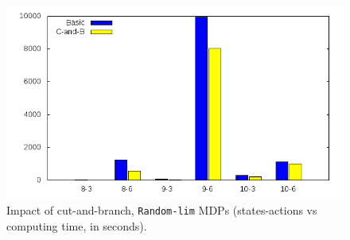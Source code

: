 \begin{figure}[]
	\begin{center}
    \includegraphics[scale=0.45]{GNUPLOT/output_trident.png}
	\end{center}
	\caption{Impact of cut-and-branch, \texttt{Random-lim} MDPs (states-actions vs computing time, in seconds).}
	\label{fig:impact_trident} 
\end{figure}
